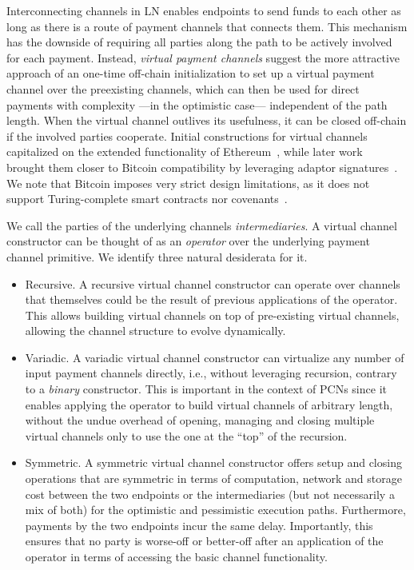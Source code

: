 Interconnecting channels in LN enables endpoints to send funds
to each other as long as there is a route of payment channels that connects
them. This mechanism has the downside of requiring all parties along the path to
be actively involved for each payment. Instead, \emph{virtual payment
channels} suggest the more attractive approach of an one-time off-chain
initialization to set up a virtual payment channel over the preexisting
channels, which can then
be used for direct payments with complexity ---in the optimistic case---
independent of the path length. When the virtual channel outlives
its usefulness, it can be closed off-chain if the involved parties cooperate.
Initial constructions for virtual channels capitalized on the extended
functionality of Ethereum~\cite{perun,DBLP:conf/ccs/DziembowskiFH18}, while
later work~\cite{9519487} brought them closer to
Bitcoin compatibility by leveraging adaptor
signatures~\cite{DBLP:journals/iacr/AumayrEEFHMMR20}. We note that Bitcoin
imposes very strict design limitations, as it does not support Turing-complete
smart contracts nor covenants~\cite{10.1007/978-3-319-70278-0_12}.

We call the parties of the underlying channels \emph{intermediaries}.
A virtual channel constructor can be thought of as an \emph{operator} over the
underlying payment channel primitive. We identify three natural
desiderata for it.

\begin{itemize}
\item Recursive. A recursive virtual channel constructor can operate over
channels that themselves could be the result of previous applications of the
operator. This allows building
virtual channels on top of pre-existing virtual channels, allowing the channel
structure to evolve dynamically.
\item Variadic. A variadic virtual channel constructor can virtualize any number
of input payment channels directly, i.e., without leveraging recursion, contrary to a \emph{binary} constructor. This is
important in the context of PCNs since it enables applying the operator to build
virtual channels of arbitrary length, without the undue overhead of opening,
managing and closing multiple virtual channels only to use the one at the
``top'' of the recursion.
\item Symmetric. A symmetric virtual channel constructor offers setup and
closing operations that are symmetric in terms of computation, network and storage cost between the two
endpoints or the intermediaries (but not necessarily a mix of both) for the
optimistic and pessimistic execution paths. Furthermore, payments by the two
endpoints incur the same delay. Importantly, this ensures that no
party is worse-off or better-off after an application of the operator in terms
of accessing the basic channel functionality.
\end{itemize}

